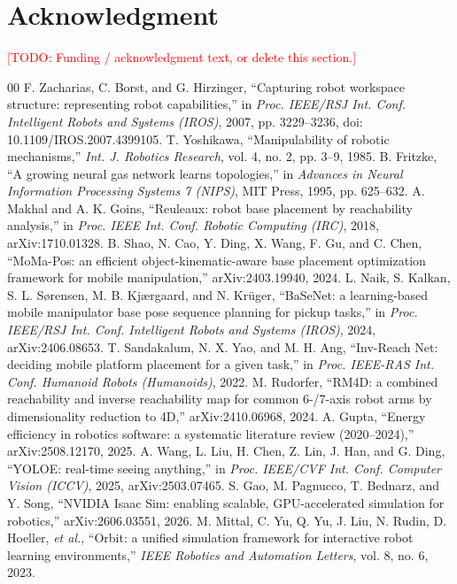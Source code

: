 \documentclass[conference]{IEEEtran}
\newcommand{\TODO}[1]{\textcolor{red}{[TODO: #1]}}
\begin{document}
\section*{Acknowledgment}
\TODO{Funding / acknowledgment text, or delete this section.}

\begin{thebibliography}{00}
 F. Zacharias, C. Borst, and G. Hirzinger, ``Capturing robot workspace structure: representing robot capabilities,'' in \textit{Proc. IEEE/RSJ Int. Conf. Intelligent Robots and Systems (IROS)}, 2007, pp. 3229--3236, doi: 10.1109/IROS.2007.4399105.
 T. Yoshikawa, ``Manipulability of robotic mechanisms,'' \textit{Int. J. Robotics Research}, vol. 4, no. 2, pp. 3--9, 1985.
 B. Fritzke, ``A growing neural gas network learns topologies,'' in \textit{Advances in Neural Information Processing Systems 7 (NIPS)}, MIT Press, 1995, pp. 625--632.
 A. Makhal and A. K. Goins, ``Reuleaux: robot base placement by reachability analysis,'' in \textit{Proc. IEEE Int. Conf. Robotic Computing (IRC)}, 2018, arXiv:1710.01328.
 B. Shao, N. Cao, Y. Ding, X. Wang, F. Gu, and C. Chen, ``MoMa-Pos: an efficient object-kinematic-aware base placement optimization framework for mobile manipulation,'' arXiv:2403.19940, 2024.
 L. Naik, S. Kalkan, S. L. S{\o}rensen, M. B. Kj{\ae}rgaard, and N. Kr{\"u}ger, ``BaSeNet: a learning-based mobile manipulator base pose sequence planning for pickup tasks,'' in \textit{Proc. IEEE/RSJ Int. Conf. Intelligent Robots and Systems (IROS)}, 2024, arXiv:2406.08653.
 T. Sandakalum, N. X. Yao, and M. H. Ang, ``Inv-Reach Net: deciding mobile platform placement for a given task,'' in \textit{Proc. IEEE-RAS Int. Conf. Humanoid Robots (Humanoids)}, 2022.
 M. Rudorfer, ``RM4D: a combined reachability and inverse reachability map for common 6-/7-axis robot arms by dimensionality reduction to 4D,'' arXiv:2410.06968, 2024.
 A. Gupta, ``Energy efficiency in robotics software: a systematic literature review (2020--2024),'' arXiv:2508.12170, 2025.
 A. Wang, L. Liu, H. Chen, Z. Lin, J. Han, and G. Ding, ``YOLOE: real-time seeing anything,'' in \textit{Proc. IEEE/CVF Int. Conf. Computer Vision (ICCV)}, 2025, arXiv:2503.07465.
 S. Gao, M. Pagnucco, T. Bednarz, and Y. Song, ``NVIDIA Isaac Sim: enabling scalable, GPU-accelerated simulation for robotics,'' arXiv:2606.03551, 2026.
 M. Mittal, C. Yu, Q. Yu, J. Liu, N. Rudin, D. Hoeller, \textit{et al.}, ``Orbit: a unified simulation framework for interactive robot learning environments,'' \textit{IEEE Robotics and Automation Letters}, vol. 8, no. 6, 2023.

\end{thebibliography}
\end{document}
